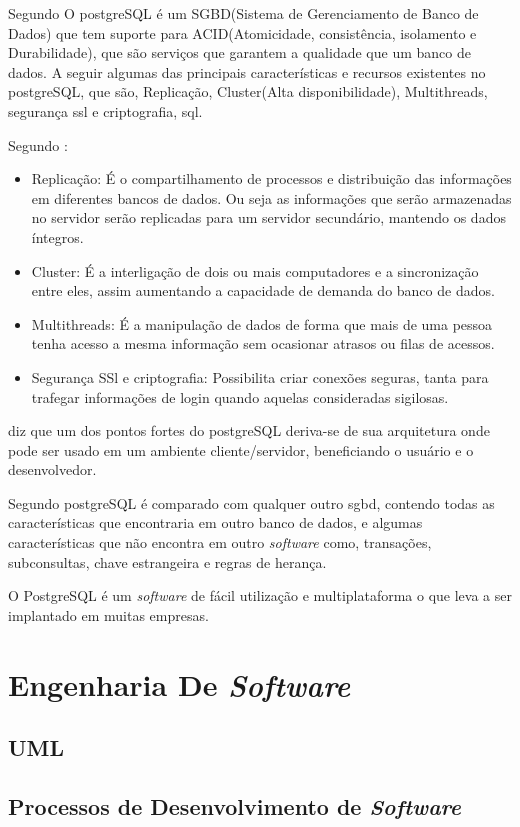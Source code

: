 \par Segundo  O postgreSQL é um SGBD(Sistema de
Gerenciamento de Banco de Dados) que tem suporte para ACID(Atomicidade,
consistência, isolamento e Durabilidade), que são serviços que garantem a
qualidade que um banco de dados. A seguir algumas das principais
características e recursos existentes no postgreSQL, que são, Replicação,
Cluster(Alta disponibilidade), Multithreads, segurança ssl e criptografia, sql.

\par Segundo :
	\begin{itemize}
	  
	  \item Replicação: É o compartilhamento de processos e distribuição das
	  informações em diferentes bancos de dados. Ou seja as informações que serão
	  armazenadas no servidor serão replicadas para um servidor secundário,
	  mantendo os dados íntegros.
	  
	  \item Cluster: É a interligação de dois ou mais computadores e a
	  sincronização entre eles, assim aumentando a capacidade de demanda do banco
	  de dados. 
	  
	  \item Multithreads: É a manipulação de dados de forma que mais de uma pessoa
	  tenha acesso a mesma informação sem ocasionar atrasos ou filas de acessos.
	  
	  \item Segurança SSl e criptografia: Possibilita criar conexões seguras,
	  tanta para trafegar informações de login quando aquelas consideradas sigilosas.
   
	\end{itemize}
	
	\par {}  diz que um dos pontos fortes do
postgreSQL deriva-se de sua arquitetura onde pode ser usado em um ambiente
cliente/servidor, beneficiando o usuário e o desenvolvedor.

	\par Segundo  postgreSQL é comparado com
qualquer outro sgbd, contendo todas as características que encontraria em outro
banco de dados, e algumas características que não encontra em outro
\textit{software} como, transações, subconsultas, chave estrangeira e regras de
herança.

	\par O PostgreSQL é um \textit{software} de fácil utilização e multiplataforma
o que leva a ser implantado em muitas empresas.


\section{Engenharia De \textit{Software}}

	\par 
	
	\subsection{UML}
		
		\par 
	
	\subsection{Processos de Desenvolvimento de \textit{Software}}
	